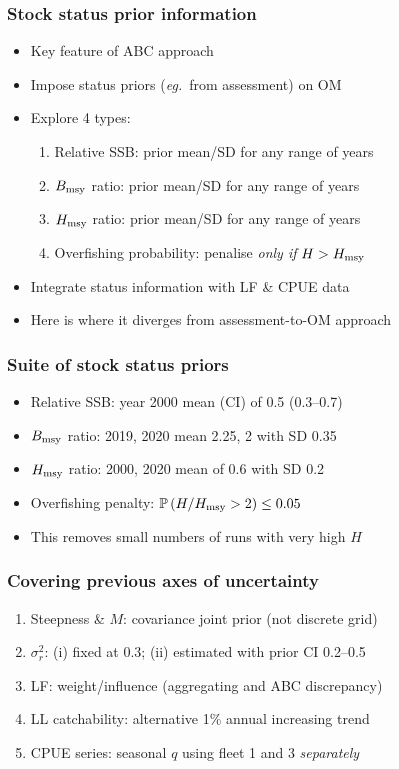 \documentclass{beamer}
\newcommand{\sigr}{\sigma^2_r}
\newcommand{\bmsy}{B_{\rm msy}}
\newcommand{\hmsy}{H_{\rm msy}}
\newcommand{\eg}{\textit{eg.}~}
\begin{document}
\begin{frame}
\frametitle{Stock status prior information}
\begin{itemize}
    \item Key feature of ABC approach
    \item Impose status priors (\eg from assessment) on OM
    \item Explore 4 types:
        \vspace{0.25cm}
        \begin{enumerate}
            \item Relative SSB: prior mean/SD for any range of years
            \item $\bmsy$ ratio: prior mean/SD for any range of years
            \item $\hmsy$ ratio: prior mean/SD for any range of years
            \item Overfishing probability: penalise \emph{only if} $H>\hmsy$
        \end{enumerate}
        \vspace{0.25cm}
    \item Integrate status information with LF \& CPUE data
    \item Here is where it diverges from assessment-to-OM approach
\end{itemize}
\end{frame}

\begin{frame}
\frametitle{Suite of stock status priors}
\begin{itemize}
    \item Relative SSB: year 2000 mean (CI) of 0.5 (0.3--0.7)
    \item $\bmsy$ ratio: 2019, 2020 mean 2.25, 2 with SD 0.35
    \item $\hmsy$ ratio: 2000, 2020 mean of 0.6 with SD 0.2
    \item Overfishing penalty: $\mathbb{P}\left(H/\hmsy>2\right)\leq 0.05$ 
    \item This removes small numbers of runs with very high $H$
\end{itemize}
\end{frame}

\begin{frame}
\frametitle{Covering previous axes of uncertainty}
\begin{enumerate}
    \item Steepness \& $M$: covariance joint prior (not discrete grid)
    \item $\sigr$: (i) fixed at 0.3; (ii) estimated with prior CI 0.2--0.5  
    \item LF: weight/influence (aggregating and ABC discrepancy) 
    \item LL catchability: alternative 1\% annual increasing trend
    \item CPUE series: seasonal $q$ using fleet 1 and 3 \emph{separately}
\end{enumerate}
\end{frame}
\end{document}
